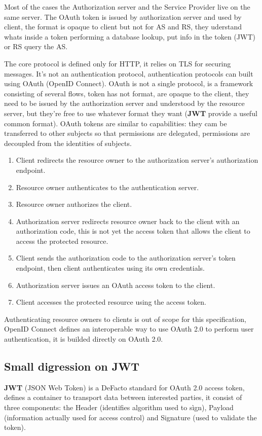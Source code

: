 \FloatBarrier

Most of the cases the Authorization server and the Service Provider live on the same server. The OAuth token is issued by authorization server and used by client, the format is opaque to client but not for AS and RS, they uderstand whats inside a token performing a database lookup, put info in the token (JWT) or RS query the AS. 

The core protocol is defined only for HTTP, it relies on TLS for securing messages. It's not an authentication protocol, authentication protocols can built using OAuth (OpenID Connect). OAuth is not a single protocol, is a framework consisting of several flows, token has not format, are opaque to the client, they need to be issued by the authorization server and understood by the resource server, but they're free to use whatever format they want (\textbf{JWT} provide a useful common format). OAuth tokens are similar to capabilities: they cam be transferred to other subjects so that permissions are delegated, permissions are decoupled from the identities of subjects.

\begin{enumerate}
    \item Client redirects the resource owner to the authorization server's authorization endpoint.
    \item Resource owner authenticates to the authentication server.
    \item Resource owner authorizes the client.
    \item Authorization server redirects resource owner back to the client with an authorization code, this is not yet the access token that allows the client to access the protected resource.
    \item Client sends the authorization code to the authorization server's token endpoint, then client authenticates using its own credentials.
    \item Authorization server issues an OAuth access token to the client.
    \item Client accesses the protected resource using the access token.
\end{enumerate}

Authenticating resource owners to clients is out of scope for this specification, OpenID Connect defines an interoperable way to use OAuth 2.0 to perform user authentication, it is builded directly on OAuth 2.0.

\subsection{Small digression on JWT}
\textbf{JWT} (JSON Web Token) is a DeFacto standard for OAuth 2.0 access token, defines a container to transport data between interested parties, it consist of three components: the Header (identifies algorithm used to sìgn), Payload (information actually used for access control) and Signature (used to validate the token).

